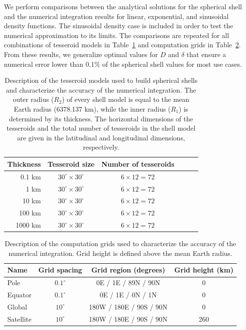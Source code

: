 \documentclass[extra, referee]{gji}
\begin{document}
We perform comparisons between the analytical solutions for the spherical shell and the
numerical integration results for linear, exponential, and sinusoidal density
functions.
The sinusoidal density case is included in order to test the numerical approximation to
its limits.
The comparisons are repeated for all combinations of tesseroid models in
Table~\ref{tab:shell-models} and computation grids in Table~\ref{tab:grids}.
From these results, we generalize optimal values for $D$ and $\delta$ that ensure a
numerical error lower than 0.1\% of the spherical shell values for most use cases.

\begin{table}
\caption{
    Description of the tesseroid models used to build spherical shells and characterize
    the accuracy of the numerical integration.
    The outer radius ($R_2$) of every shell model is equal to the mean Earth radius
    (6378.137 km), while the inner radius ($R_1$) is determined by its thickness.
    The horizontal dimensions of the tesseroids and the total number of
    tesseroids in the shell model are given in the latitudinal and longitudinal
    dimensions, respectively.
}
\label{tab:shell-models}
\begin{tabular}{rccccc}
    Thickness & Tesseroid size & Number of tesseroids \\ \hline
    0.1 km  & $30^\circ \times 30^\circ$ & $6 \times 12 = 72$ \\
    1 km    & $30^\circ \times 30^\circ$ & $6 \times 12 = 72$ \\
    10 km   & $30^\circ \times 30^\circ$ & $6 \times 12 = 72$ \\
    100 km  & $30^\circ \times 30^\circ$ & $6 \times 12 = 72$ \\
    1000 km & $30^\circ \times 30^\circ$ & $6 \times 12 = 72$ \\
\end{tabular}
\end{table}

\begin{table}
\caption{
    Description of the computation grids used to characterize the accuracy of the
    numerical integration.
    Grid height is defined above the mean Earth radius.
}
\label{tab:grids}
\begin{tabular}{lccc}
    Name & Grid spacing & Grid region (degrees) & Grid height (km)
    \\ \hline
    Pole      & $0.1^\circ$ &   0E /   1E / 89N / 90N & 0   \\
    Equator   & $0.1^\circ$ &   0E /   1E /  0N / 1N  & 0   \\
    Global    & $ 10^\circ$ & 180W / 180E / 90S / 90N & 0   \\
    Satellite & $ 10^\circ$ & 180W / 180E / 90S / 90N & 260 \\
\end{tabular}
\end{table}
\end{document}

